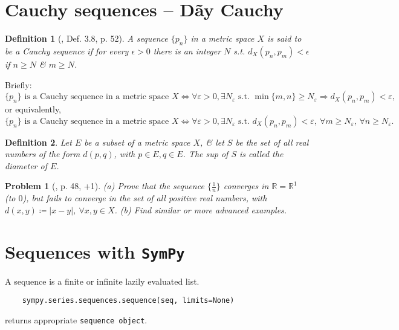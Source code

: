 \documentclass[oneside]{book}
\newtheorem{definition}{Definition}
\newtheorem{problem}{Problem}
\begin{document}

\section{Cauchy sequences -- Dãy Cauchy}

\begin{definition}[\cite{Rudin1976}, Def. 3.8, p. 52]
	A sequence $\{p_n\}$ in a metric space $X$ is said to be a {\rm Cauchy sequence} if for every $\epsilon > 0$ there is an integer $N$ s.t. $d_X(p_n,p_m) < \epsilon$ if $n\ge N$ \& $m\ge N$.
\end{definition}
Briefly:
\begin{equation*}
	\{p_n\}\mbox{ is a Cauchy sequence in a metric space } X\Leftrightarrow\forall\varepsilon > 0,\exists N_\varepsilon\mbox{ s.t. }\min\{m,n\}\ge N_\varepsilon\Rightarrow d_X(p_n,p_m) < \varepsilon, 
\end{equation*}
or equivalently,
\begin{equation*}
	\{p_n\}\mbox{ is a Cauchy sequence in a metric space } X\Leftrightarrow\forall\varepsilon > 0,\exists N_\varepsilon\mbox{ s.t. }d_X(p_n,p_m) < \varepsilon,\ \forall m\ge N_\varepsilon,\,\forall n\ge N_\varepsilon.
\end{equation*}

\begin{definition}
	Let $E$ be a subset of a metric space $X$, \& let $S$ be the set of all real numbers of the form $d(p,q)$, with $p\in E,q\in E$. The sup of $S$ is called the {\rm diameter} of $E$.
\end{definition}

\begin{problem}[\cite{Rudin1976}, p. 48, +1]
	(a) Prove that the sequence $\{\frac{1}{n}\}$ converges in $\mathbb{R} = \mathbb{R}^1$ (to $0$), but fails to converge in the set of all positive real numbers, with $d(x,y)\coloneqq|x - y|$, $\forall x,y\in X$. (b) Find similar or more advanced examples.
\end{problem}


\section{Sequences with {\tt SymPy}}
A sequence is a finite or infinite lazily evaluated list.
\begin{verbatim}
	sympy.series.sequences.sequence(seq, limits=None)
\end{verbatim}
returns appropriate {\tt sequence object}.
\end{document}
